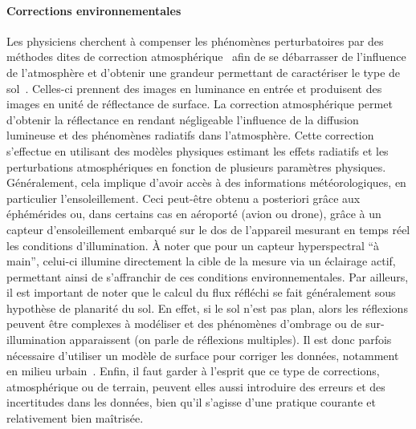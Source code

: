 \paragraph{Corrections environnementales}
Les physiciens cherchent à compenser les phénomènes perturbatoires par des méthodes dites de correction atmosphérique~\cite{deschamps_atmospheric_1980, rahman_smac:_1994, chavez_image-based_1996} afin de se débarrasser de l'influence de l'atmosphère et d'obtenir une grandeur permettant de caractériser le type de sol~\cite{gao_atmospheric_2009}. Celles-ci prennent des images en luminance en entrée et produisent des images en unité de réflectance de surface. La correction atmosphérique permet d'obtenir la réflectance en rendant négligeable l'influence de la diffusion lumineuse et des phénomènes radiatifs dans l'atmosphère. Cette correction s'effectue en utilisant des modèles physiques estimant les effets radiatifs et les perturbations atmosphériques en fonction de plusieurs paramètres physiques. Généralement, cela implique d'avoir accès à des informations météorologiques, en particulier l'ensoleillement. Ceci peut-être obtenu a posteriori grâce aux éphémérides ou, dans certains cas en aéroporté (avion ou drone), grâce à un capteur d'ensoleillement embarqué sur le dos de l'appareil mesurant en temps réel les conditions d'illumination. À noter que pour un capteur hyperspectral ``à main'', celui-ci illumine directement la cible de la mesure via un éclairage actif, permettant ainsi de s'affranchir de ces conditions environnementales.
Par ailleurs, il est important de noter que le calcul du flux réfléchi se fait généralement sous hypothèse de planarité du sol. En effet, si le sol n'est pas plan, alors les réflexions peuvent être complexes à modéliser et des phénomènes d'ombrage ou de sur-illumination apparaissent (on parle de réflexions multiples). Il est donc parfois nécessaire d'utiliser un modèle de surface pour corriger les données, notamment en milieu urbain~\cite{ceamanos_using_2017}.
Enfin, il faut garder à l'esprit que ce type de corrections, atmosphérique ou de terrain, peuvent elles aussi introduire des erreurs et des incertitudes dans les données, bien qu'il s'agisse d'une pratique courante et relativement bien maîtrisée.

